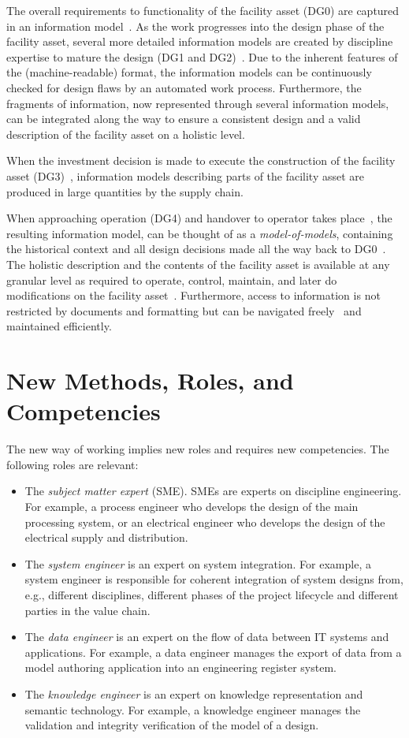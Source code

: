 \documentclass[../main.tex]{subfiles}
\begin{document}
The overall requirements to functionality of the facility asset (DG0) are captured in an information model~.
As the work progresses into the design phase of the facility asset, several more detailed information models are
created by discipline expertise to mature the design (DG1 and DG2)~. Due to the inherent features of the
(machine-readable) format, the information models can be continuously checked for design flaws by an automated work process. Furthermore, the fragments of information, now represented through several
information models, can be integrated along the way to ensure a consistent design and a valid description of the
facility asset on a holistic level.

When the investment decision is made to execute the construction of the facility asset (DG3)~, information
models describing parts of the facility asset are produced in large quantities by the supply chain.

When approaching operation (DG4) and handover to operator takes place~, the resulting information model, can
be thought of as a \emph{model-of-models}, containing the historical context and all design decisions made all the way back to DG0~.
The holistic description and the contents of the facility asset is available at any granular level as required to operate, control, maintain, and later do modifications on the facility asset~. Furthermore, access to
information is not restricted by documents and formatting but can be navigated freely~ and maintained efficiently.

\section{New Methods, Roles, and Competencies}
\label{sec:newmethodsroles}
The new way of working implies new roles and requires new
competencies. The following roles are relevant:

\begin{itemize}
  \item The \emph{subject matter expert} (SME). SMEs are experts on discipline engineering. For example, a process
        engineer who develops the design of the main processing system, or an electrical engineer who develops the design of
        the electrical supply and distribution.
  \item The \emph{system engineer} is an expert on system integration. For example, a system engineer is responsible
        for coherent integration of system designs from, e.g., different disciplines, different phases of the project
        lifecycle and different parties in the value chain.
  \item The \emph{data engineer} is an expert on the flow of data between IT systems and applications. For example, a
        data engineer manages the export of data from a model authoring application into an engineering register system.
  \item The \emph{knowledge engineer} is an expert on knowledge representation and semantic technology. For example, a knowledge engineer manages
        the validation and integrity verification of the model of a design.
\end{itemize}
\end{document}

